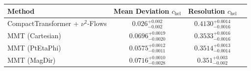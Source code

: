     \begin{tabular}{lccc}
        \toprule
        Method & Mean Deviation $c_{\text{hel}}$ & Resolution $c_{\text{hel}}$ \\
        \midrule
        CompactTransformer + $\nu^2$-Flows & $0.026^{+0.002}_{-0.002}$ & $0.4130^{+0.0014}_{-0.0016}$ \\
        MMT (Cartesian) & $0.0696^{+0.0019}_{-0.0020}$ & $0.3533^{+0.0016}_{-0.0016}$ \\
        MMT (PtEtaPhi) & $0.0575^{+0.0012}_{-0.0011}$ & $0.3514^{+0.0013}_{-0.0014}$ \\
        MMT (MagDir) & $0.0716^{+0.0010}_{-0.0028}$ & $0.351^{+0.003}_{-0.002}$ \\
        \bottomrule
    \end{tabular}
